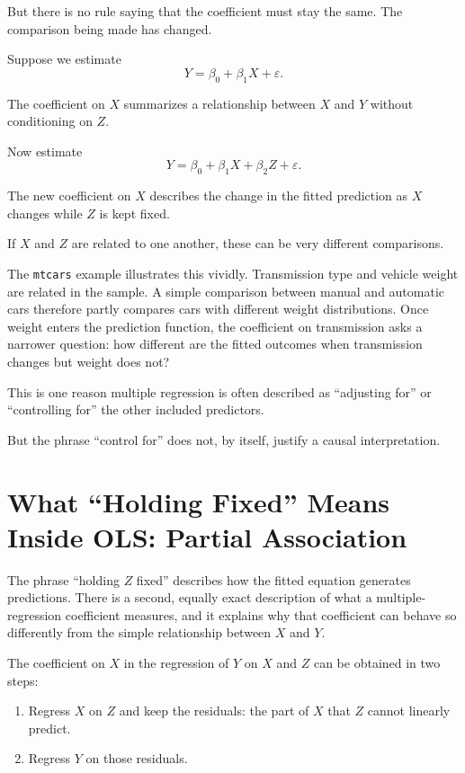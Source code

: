 \documentclass[11pt]{report}
\begin{document}
But there is no rule saying that the coefficient must stay the same. The comparison being made has changed.

Suppose we estimate
\[
Y=\beta_0+\beta_1X+\varepsilon.
\]

The coefficient on \(X\) summarizes a relationship between \(X\) and \(Y\) without conditioning on \(Z\).

Now estimate
\[
Y=\beta_0+\beta_1X+\beta_2Z+\varepsilon.
\]

The new coefficient on \(X\) describes the change in the fitted prediction as \(X\) changes while \(Z\) is kept fixed.

If \(X\) and \(Z\) are related to one another, these can be very different comparisons.

The \texttt{mtcars} example illustrates this vividly. Transmission type and vehicle weight are related in the sample. A simple comparison between manual and automatic cars therefore partly compares cars with different weight distributions. Once weight enters the prediction function, the coefficient on transmission asks a narrower question: how different are the fitted outcomes when transmission changes but weight does not?

This is one reason multiple regression is often described as ``adjusting for'' or ``controlling for'' the other included predictors.

But the phrase ``control for'' does not, by itself, justify a causal interpretation.

\section{What ``Holding Fixed'' Means Inside OLS: Partial Association}
\label{sec:partial_association}

The phrase ``holding \(Z\) fixed'' describes how the fitted equation generates predictions. There is a second, equally exact description of what a multiple-regression coefficient measures, and it explains why that coefficient can behave so differently from the simple relationship between \(X\) and \(Y\).

The coefficient on \(X\) in the regression of \(Y\) on \(X\) and \(Z\) can be obtained in two steps:

\begin{enumerate}
    \item Regress \(X\) on \(Z\) and keep the residuals: the part of \(X\) that \(Z\) cannot linearly predict.
    \item Regress \(Y\) on those residuals.
\end{enumerate}
\end{document}
